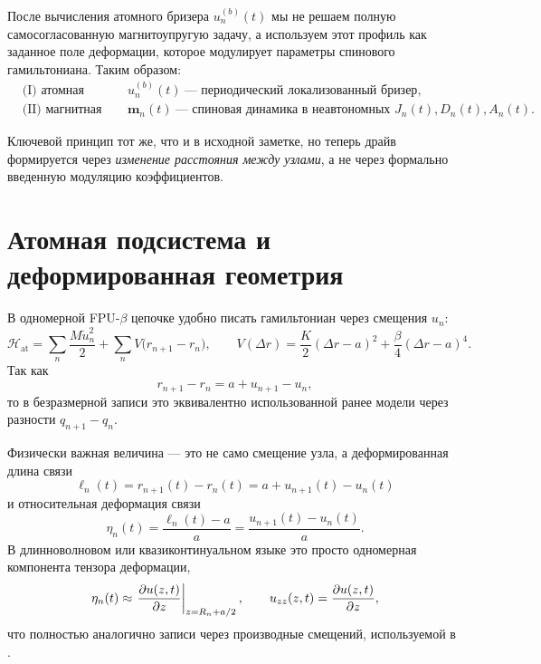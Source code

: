 \documentclass[12pt,a4paper]{article}
\newcommand{\Hatom}{\mathcal{H}_{\mathrm{at}}}
\newcommand{\m}{\bm{m}}
\newcommand{\ezz}{u_{zz}}
\begin{document}
После вычисления атомного бризера $u_n^{(b)}(t)$ мы не решаем полную самосогласованную магнитоупругую задачу, а используем этот профиль как заданное поле деформации, которое модулирует параметры спинового гамильтониана. Таким образом:
\begin{align}
&\text{(I) атомная задача:} && u_n^{(b)}(t) \ \text{--- периодический локализованный бризер}, \\
&\text{(II) магнитная задача:} && \m_n(t) \ \text{--- спиновая динамика в неавтономных } J_n(t),D_n(t),A_n(t).
\end{align}

Ключевой принцип тот же, что и в исходной заметке, но теперь драйв формируется через \emph{изменение расстояния между узлами}, а не через формально введенную модуляцию коэффициентов.

\section{Атомная подсистема и деформированная геометрия}
В одномерной FPU-$\beta$ цепочке удобно писать гамильтониан через смещения $u_n$:
\begin{equation}
\Hatom = \sum_n \frac{M\dot u_n^2}{2} + \sum_n V\bigl(r_{n+1}-r_n\bigr),
\qquad
V(\Delta r)=\frac{K}{2}(\Delta r-a)^2+\frac{\beta}{4}(\Delta r-a)^4.
\label{eq:Hatom_physical}
\end{equation}
Так как
\begin{equation}
r_{n+1}-r_n = a + u_{n+1}-u_n,
\end{equation}
то в безразмерной записи это эквивалентно использованной ранее модели через разности $q_{n+1}-q_n$.

Физически важная величина --- это не само смещение узла, а деформированная длина связи
\begin{equation}
\ell_n(t)=r_{n+1}(t)-r_n(t)=a+u_{n+1}(t)-u_n(t)
\label{eq:ell_n}
\end{equation}
и относительная деформация связи
\begin{equation}
\eta_n(t)=\frac{\ell_n(t)-a}{a}=\frac{u_{n+1}(t)-u_n(t)}{a}.
\label{eq:eta_n_discrete}
\end{equation}
В длинноволновом или квазиконтинуальном языке это просто одномерная компонента тензора деформации,
\begin{equation}
\eta_n(t)\approx \eval{\pdv{u(z,t)}{z}}_{z=R_n+a/2},
\qquad
\ezz(z,t)=\pdv{u(z,t)}{z},
\label{eq:strain_continuum}
\end{equation}
что полностью аналогично записи через производные смещений, используемой в \cite{Tereshchenko2022}.
\end{document}
